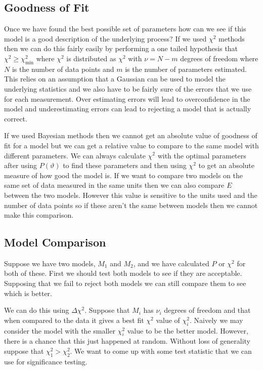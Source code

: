 \documentclass[a4paper]{article}
\begin{document}
    \subsection{Goodness of Fit}
    Once we have found the best possible set of parameters how can we see if this model is a good description of the underlying process?
    If we used \(\chi^2\) methods then we can do this fairly easily by performing a one tailed hypothesis that \(\chi^2 \ge \chi^2_{\min}\) where \(\chi^2\) is distributed as \(\chi^2\) with \(\nu = N - m\) degrees of freedom where \(N\) is the number of data points and \(m\) is the number of parameters estimated.
    This relies on an assumption that a Gaussian can be used to model the underlying statistics and we also have to be fairly sure of the errors that we use for each measurement.
    Over estimating errors will lead to overconfidence in the model and underestimating errors can lead to rejecting a model that is actually correct.
    
    If we used Bayesian methods then we cannot get an absolute value of goodness of fit for a model but we can get a relative value to compare to the same model with different parameters.
    We can always calculate \(\chi^2\) with the optimal parameters after using \(P(\vartheta)\) to find these parameters and then using \(\chi^2\) to get an absolute measure of how good the model is.
    If we want to compare two models on the same set of data measured in the same units then we can also compare \(E\) between the two models.
    However this value is sensitive to the units used and the number of data points so if these aren't the same between models then we cannot make this comparison.
    
    \subsection{Model Comparison}
    Suppose we have two models, \(M_1\) and \(M_2\), and we have calculated \(P\) or \(\chi^2\) for both of these.
    First we should test both models to see if they are acceptable.
    Supposing that we fail to reject both models we can still compare them to see which is better.
    
    We can do this using \(\Delta \chi^2\).
    Suppose that \(M_i\) has \(\nu_i\) degrees of freedom and that when compared to the data it gives a best fit \(\chi^2\) value of \(\chi^2_i\).
    Naively we may consider the model with the smaller \(\chi^2_i\) value to be the better model.
    However, there is a chance that this just happened at random.
    Without loss of generality suppose that \(\chi^2_1 > \chi^2_2\).
    We want to come up with some test statistic that we can use for significance testing.
    
\end{document}
